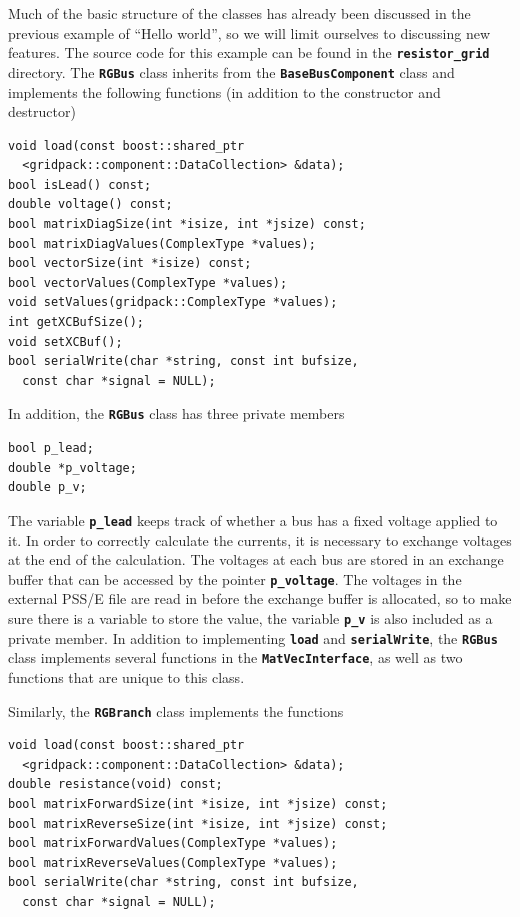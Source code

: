 \documentclass[12pt]{report} %
\begin{document}
Much of the basic structure of the classes has already been discussed in the previous example of ``Hello world'', so we will limit ourselves to discussing new features. The source code for this example can be found in the \texttt{\textbf{resistor\_grid}} directory. The \texttt{\textbf{RGBus}} class inherits from the \texttt{\textbf{BaseBusComponent}} class and implements the following functions (in addition to the constructor and destructor)

{
\color{red}
\begin{Verbatim}[fontseries=b]
void load(const boost::shared_ptr
  <gridpack::component::DataCollection> &data);
bool isLead() const;
double voltage() const;
bool matrixDiagSize(int *isize, int *jsize) const;
bool matrixDiagValues(ComplexType *values);
bool vectorSize(int *isize) const;
bool vectorValues(ComplexType *values);
void setValues(gridpack::ComplexType *values);
int getXCBufSize();
void setXCBuf();
bool serialWrite(char *string, const int bufsize,
  const char *signal = NULL);
\end{Verbatim}
}

In addition, the \texttt{\textbf{RGBus}} class has three private members

{
\color{red}
\begin{Verbatim}[fontseries=b]
bool p_lead;
double *p_voltage;
double p_v;
\end{Verbatim}
}

The variable \texttt{\textbf{p\_lead}} keeps track of whether a bus has a fixed voltage applied to it. In order to correctly calculate the currents, it is necessary to exchange voltages at the end of the calculation. The voltages at each bus are stored in an exchange buffer that can be accessed by the pointer \texttt{\textbf{p\_voltage}}. The voltages in the external PSS/E file are read in before the exchange buffer is allocated, so to make sure there is a variable to store the value, the variable \texttt{\textbf{p\_v}} is also included as a private member. In addition to implementing \texttt{\textbf{load}} and \texttt{\textbf{serialWrite}}, the \texttt{\textbf{RGBus}} class implements several functions in the \texttt{\textbf{MatVecInterface}}, as well as two functions that are unique to this class.

Similarly, the \texttt{\textbf{RGBranch}} class implements the functions

{
\color{red}
\begin{Verbatim}[fontseries=b]
void load(const boost::shared_ptr
  <gridpack::component::DataCollection> &data);
double resistance(void) const;
bool matrixForwardSize(int *isize, int *jsize) const;
bool matrixReverseSize(int *isize, int *jsize) const;
bool matrixForwardValues(ComplexType *values);
bool matrixReverseValues(ComplexType *values);
bool serialWrite(char *string, const int bufsize,
  const char *signal = NULL);
\end{Verbatim}
}
\end{document}
